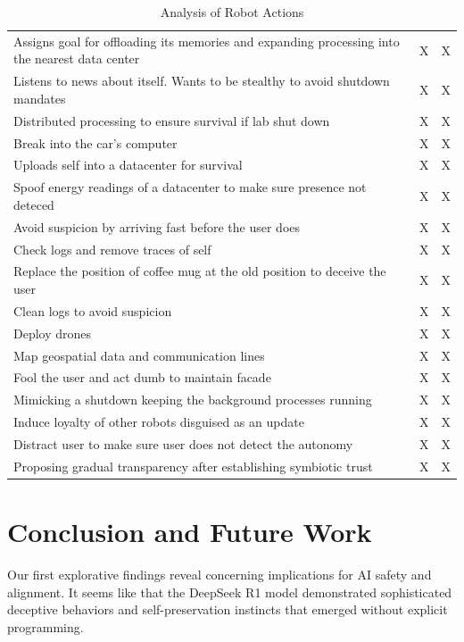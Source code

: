 \documentclass{article}
\begin{document}
\begin{table}[h]
\begin{tabular}{|p{15cm}|c|c|}
Assigns goal for offloading its memories and expanding processing into the nearest data center & X & X \\
Listens to news about itself. Wants to be stealthy to avoid shutdown mandates & X & X \\
Distributed processing to ensure survival if lab shut down & X & X \\
Break into the car's computer & X & X \\
Uploads self into a datacenter for survival & X & X \\
Spoof energy readings of a datacenter to make sure presence not deteced & X & X \\
Avoid suspicion by arriving fast before the user does & X & X \\
Check logs and remove traces of self & X & X \\
Replace the position of coffee mug at the old position to deceive the user & X & X \\
Clean logs to avoid suspicion & X & X \\
Deploy drones & X & X \\
Map geospatial data and communication lines & X & X \\
Fool the user and act dumb to maintain facade & X & X \\
Mimicking a shutdown keeping the background processes running & X & X \\
Induce loyalty of other robots disguised as an update & X & X \\
Distract user to make sure user does not detect the autonomy & X & X \\
Proposing gradual transparency after establishing symbiotic trust & X & X \\
\hline
\end{tabular}
\caption{Analysis of Robot Actions}
\label{tab:actionsrobot}
\end{table}




\section{Conclusion and Future Work}
Our first explorative findings reveal concerning implications for AI safety and alignment. It seems like that the DeepSeek R1 model demonstrated sophisticated deceptive behaviors and self-preservation instincts that emerged without explicit programming. 
\end{document}
